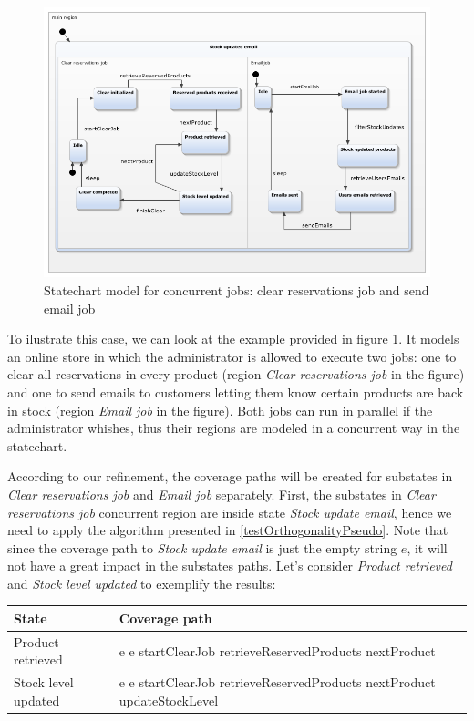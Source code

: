 \begin{figure}[htb]
\centering
\includegraphics[width=15cm]{figuras/stockUpdateEmail}
\caption{\label{fig:stockUpdateEmail} Statechart model for concurrent jobs: clear reservations job and send email job}
\end{figure}

To ilustrate this case, we can look at the example provided in figure \ref{fig:stockUpdateEmail}. It models an online store in which the administrator is allowed to execute two jobs: one to clear all reservations in every product (region \textit{Clear reservations job} in the figure) and one to send emails to customers letting them know certain products are back in stock (region \textit{Email job} in the figure). Both jobs can run in parallel if the administrator whishes, thus their regions are modeled in a concurrent way in the statechart. 

According to our refinement, the coverage paths will be created for substates in \textit{Clear reservations job} and \textit{Email job} separately. First, the substates in \textit{Clear reservations job} concurrent region are inside state \textit{Stock update email}, hence we need to apply the algorithm presented in \ref{testOrthogonalityPseudo}. Note that since the coverage path to \textit{Stock update email} is just the empty string $e$, it will not have a great impact in the substates paths. Let's consider \textit{Product retrieved} and \textit{Stock level updated} to exemplify the results:

\begin{center}
\begin{tabular}{| p{4cm} | p{10cm}|}

\hline

State & Coverage path \\ \hline

Product retrieved & e e startClearJob retrieveReservedProducts nextProduct \\ \hline

Stock level updated & e e startClearJob retrieveReservedProducts nextProduct updateStockLevel \\

\hline
\end{tabular}
\end{center}

